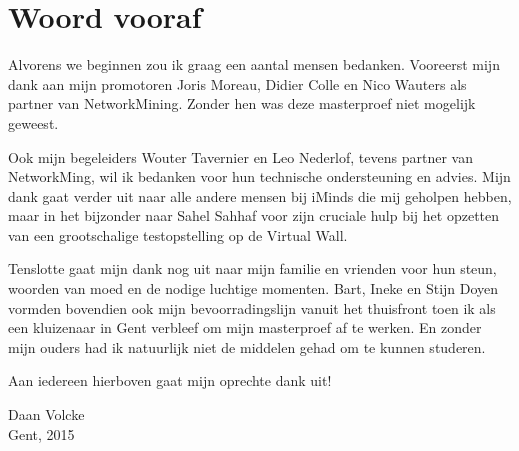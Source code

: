 \chapter*{Woord vooraf}

Alvorens we beginnen zou ik graag een aantal mensen bedanken.
Vooreerst mijn dank aan mijn promotoren Joris Moreau, Didier Colle en Nico Wauters als partner van NetworkMining.
Zonder hen was deze masterproef niet mogelijk geweest.

Ook mijn begeleiders Wouter Tavernier en Leo Nederlof, tevens partner van NetworkMing, wil ik bedanken voor hun technische ondersteuning en advies.
Mijn dank gaat verder uit naar alle andere mensen bij iMinds die mij geholpen hebben,
maar in het bijzonder naar Sahel Sahhaf voor zijn cruciale hulp bij het opzetten van een grootschalige testopstelling op de Virtual Wall.

Tenslotte gaat mijn dank nog uit naar mijn familie en vrienden voor hun steun, woorden van moed en de nodige luchtige momenten.
Bart, Ineke en Stijn Doyen vormden bovendien ook mijn bevoorradingslijn vanuit het thuisfront toen ik als een kluizenaar in Gent verbleef om mijn masterproef af te werken.
En zonder mijn ouders had ik natuurlijk niet de middelen gehad om te kunnen studeren.


Aan iedereen hierboven gaat mijn oprechte dank uit!


\begin{flushright}
Daan Volcke \\
Gent, 2015
\end{flushright}


